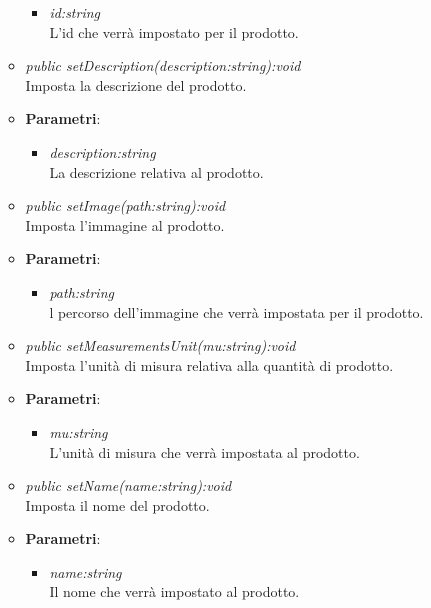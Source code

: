 \begin{itemize}
\begin{itemize}
{\begin{itemize}
				\item \textit{id:string}\\
						L'id che verrà impostato per il prodotto.
			\end{itemize}}
	\item \textit{public setDescription(description:string):void}\\
	Imposta la descrizione del prodotto.
				\item{\textbf{Parametri}: \begin{itemize}
				\item \textit{description:string}\\
				La descrizione relativa al prodotto.
			\end{itemize}}
	\item \textit{public setImage(path:string):void}\\
	Imposta l'immagine al prodotto.
				\item{\textbf{Parametri}: \begin{itemize}
				\item \textit{path:string}\\
				l percorso dell'immagine che verrà impostata per il prodotto.
			\end{itemize}}
	\item \textit{public setMeasurementsUnit(mu:string):void}\\
	Imposta l'unità di misura relativa alla quantità di prodotto.
				\item{\textbf{Parametri}: \begin{itemize}
				\item \textit{mu:string}\\
				L'unità di misura che verrà impostata al prodotto.
			\end{itemize}}
	\item \textit{public setName(name:string):void}\\
	Imposta il nome del prodotto.
				\item{\textbf{Parametri}: \begin{itemize}
				\item \textit{name:string}\\
				Il nome che verrà impostato al prodotto.
			\end{itemize}}


\end{itemize}
\end{itemize}
